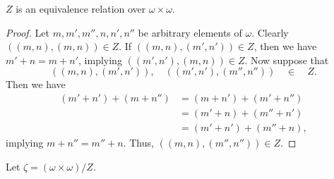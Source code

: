 \documentclass[11pt]{article}
\begin{document}
\begin{proposition}
  $Z$ is an equivalence relation over $\omega \times \omega$.
\end{proposition}
\begin{proof}
  Let $m, m', m'', n, n', n''$ be arbitrary elements of $\omega$.
  Clearly $((m, n), (m, n)) \in Z$.
  If $((m, n), (m', n')) \in Z$, then we have $m' + n = m + n'$, implying $((m', n'), (m, n)) \in Z$.
  Now suppose that
  \begin{equation*}
    ((m, n), (m', n')), \quad ((m', n'), (m'', n'')) \quad \in \quad Z.
  \end{equation*}
  Then we have
  \begin{align*}
    (m' + n') + (m + n'')
    &= (m + n') + (m' + n'') \\
    &= (m' + n) + (m'' + n') \\
    &= (m' + n') + (m'' + n),
  \end{align*}
  implying $m + n'' = m'' + n$.
  Thus, $((m, n), (m'', n'')) \in Z$.
\end{proof}

\begin{definition}
  Let $\zeta = (\omega \times \omega) / Z$.
\end{definition}
\end{document}
